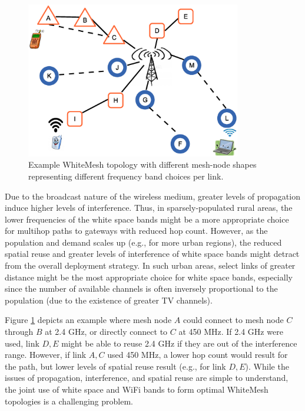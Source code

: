 \begin{figure}
\vspace{-0.1in}
\centering
\includegraphics[width=94mm]{figures/interferencerange}
\vspace{-0.5in}
\caption{Example WhiteMesh topology with different mesh-node shapes 
representing different frequency band choices per link.}
\label{fig:interferencerange}
\vspace{-0.2in}
\end{figure}

Due to the broadcast nature of the wireless medium, greater levels of
propagation induce higher levels of interference.  Thus, in sparsely-populated
rural areas, the lower frequencies of the white space bands might be a
more appropriate choice for multihop paths to gateways with reduced hop
count. However, as the population and demand scales up (e.g., for more 
urban regions), the reduced spatial reuse and greater levels of interference 
of white space bands might detract from the overall deployment strategy. In 
such urban areas, select links of greater distance might be the most 
appropriate choice for white space bands, especially since the number of 
available channels is often inversely proportional to the population (due 
to the existence of greater TV channels).

Figure \ref{fig:interferencerange} depicts an example where mesh node $A$ 
could connect to mesh node $C$ through $B$ at 2.4 GHz, or directly connect 
to $C$ at 450 MHz. If 2.4 GHz were used, link $D,E$ might be able to reuse
2.4 GHz if they are out of the interference range. However, if link $A,C$
used 450 MHz, a lower hop count would result for the path, but lower levels
of spatial reuse result (e.g., for link $D,E$). While the issues of 
propagation, interference, and spatial reuse are simple to understand,
the joint use of white space and WiFi bands to form optimal WhiteMesh 
topologies is a challenging problem.

